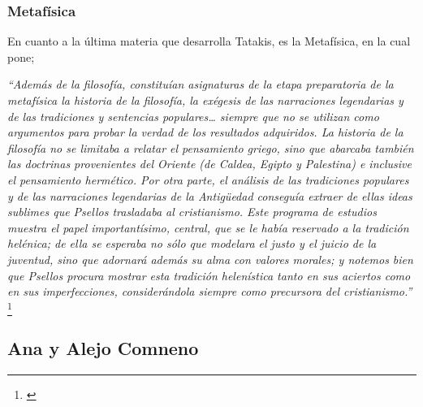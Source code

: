 \subsubsection{Metafísica}
En cuanto a la última materia que desarrolla Tatakis, 
es la Metafísica, en la cual pone;

\textit{“Además de la filosofía, constituían asignaturas de la etapa 
preparatoria de la metafísica la historia de la filosofía, 
la exégesis de las narraciones legendarias y de las tradiciones 
y sentencias populares… siempre que no se utilizan como argumentos 
para probar la verdad de los resultados adquiridos. 
La historia de la filosofía no se limitaba  a relatar el pensamiento 
griego, sino que abarcaba también las doctrinas provenientes del 
Oriente (de Caldea, Egipto y Palestina) e inclusive el pensamiento 
hermético. 
Por otra parte, el análisis de las tradiciones populares y de las 
narraciones legendarias de la Antigüedad conseguía extraer de ellas 
ideas sublimes que Psellos trasladaba al cristianismo. 
Este programa de estudios muestra el papel importantísimo, central, 
que se le había reservado a la tradición helénica; 
de ella se esperaba no sólo que modelara el justo y el juicio de la 
juventud, sino que adornará además su alma con valores morales; 
y notemos bien que Psellos procura mostrar esta tradición helenística 
tanto en sus aciertos como en sus imperfecciones, 
considerándola siempre como precursora del cristianismo.”}
\footnote{\cite[p.~165]{filosofia}}

\subsection{Ana y Alejo Comneno}



